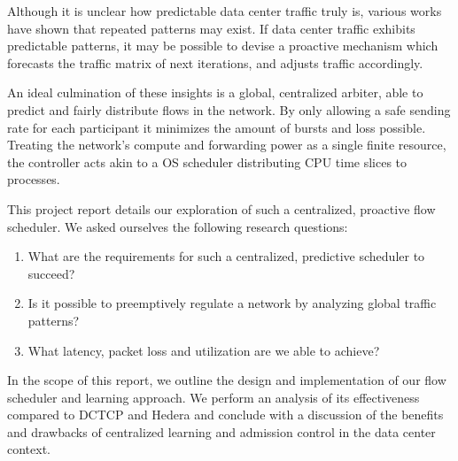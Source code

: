 Although it is unclear how predictable data center traffic truly is, various 
works have shown that repeated patterns may 
exist.\cite{msr_dc,fb_dc,traffic,microte}
If data center traffic exhibits predictable patterns, it may be 
possible to devise a proactive mechanism which forecasts the traffic matrix of 
next iterations, and adjusts traffic accordingly.

An ideal culmination of these insights is a global, 
centralized arbiter, able to predict and fairly distribute flows in the 
network. By only allowing a safe sending rate for each participant it minimizes 
the amount of bursts and loss possible.
Treating the network's compute and forwarding power as a single finite 
resource, the controller acts akin to a OS scheduler distributing CPU time 
slices to processes.

This project report details our exploration of such a centralized, 
proactive flow scheduler. We asked ourselves the following research questions:
\begin{enumerate}
    \item What are the requirements for such a centralized, predictive 
    scheduler to succeed?
    \item Is it possible to preemptively regulate a network by analyzing global 
    traffic patterns?
    \item What latency, packet loss and utilization are we able to achieve?
\end{enumerate}
In the scope of this report, we outline the design and implementation of our 
flow scheduler and learning approach. We perform an analysis of its 
effectiveness compared to DCTCP and Hedera and conclude with a discussion of 
the benefits and drawbacks of centralized learning and admission control in the 
data center context.
